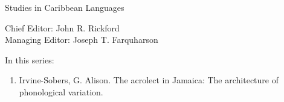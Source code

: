 {\large Studies in Caribbean Languages}

\bigskip

Chief Editor: John R. Rickford\\
Managing Editor: Joseph T. Farquharson

\bigskip

In this series:

\begin{enumerate}
\item Irvine-Sobers,  G. Alison. The acrolect in Jamaica: The architecture of phonological variation.
\end{enumerate}


\vfill

